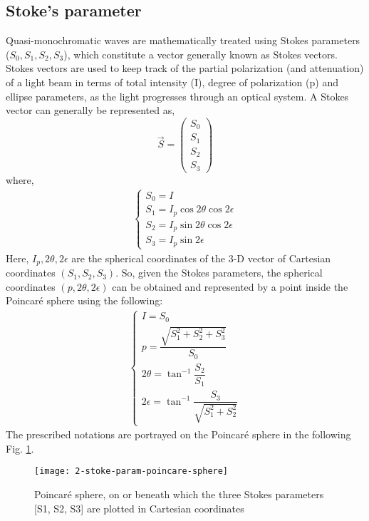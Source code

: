 \documentclass[../report.tex]{subfiles}
\begin{document}
		\subsection{Stoke's parameter} 		
Quasi-monochromatic waves are mathematically treated using Stokes parameters ($S_0,S_1,S_2,S_3$), which constitute a vector generally known as Stokes vectors. Stokes vectors are used to keep track of the partial polarization (and attenuation) of a light beam in terms of total intensity (I), degree of polarization (p) and ellipse parameters, as the light progresses through an optical system. A Stokes vector can generally be represented as,
\begin{equation}\label{eq:stokes_vector}
\overrightarrow {S} = \left(\begin{matrix}  
	S_0 \\
	S_1 \\
	S_2 \\
	S_3
\end{matrix} \right) 
\end{equation}
where,
\begin{equation}\label{eq:stokes_parameters}
\begin{aligned}
\begin{cases}
S_{0}=I\\ 
S_{1}=I_{p}\cos 2\theta \cos 2\epsilon \\
S_{2}=I_{p}\sin 2\theta \cos 2\epsilon \\
S_{3}=I_{p}\sin 2\epsilon
\end{cases}
\end{aligned}
\end{equation}
Here, $I_p, 2\theta, 2\epsilon$ are the spherical coordinates of the 3-D vector of Cartesian coordinates $(S_1,S_2,S_3)$. So, given the Stokes parameters, the spherical coordinates $(p,2\theta,2\epsilon)$ can be obtained and represented by a point inside the Poincaré sphere using the following:
\begin{equation}\label{eq:stokes_spherical_coordinates}
\begin{aligned}
\begin{cases}
I = S_{0}\\ 
p = \dfrac {\sqrt {S_{1}^{2}+S_{2}^{2}+S_{3}^{2}}} {S_{0}} \\
2\theta = \tan^{-1}\dfrac {S_{2}} {S_{1}} \\
2\epsilon = \tan ^{-1}\dfrac {S_{3}} {\sqrt {S_{1}^{2}+S_{2}^{2}}}
\end{cases}
\end{aligned}
\end{equation}
The prescribed notations are portrayed on the Poincaré sphere in the following Fig. \ref{fig:2_stoke_param_poincare_sphere}.    
\begin{figure}[H]
	\centering
	\texttt{[image: 2-stoke-param-poincare-sphere]}
	\caption{Poincaré sphere, on or beneath which the three Stokes parameters [S1, S2, S3] are plotted in Cartesian coordinates \cite{stoke_poincare_parameter}}
	\label{fig:2_stoke_param_poincare_sphere}
\end{figure}
		
\end{document}
